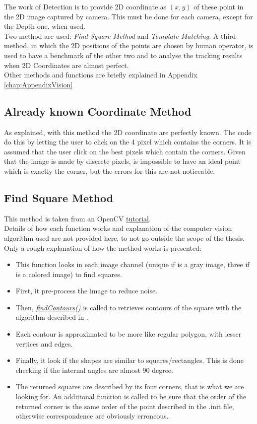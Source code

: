 The work of Detection is to provide 2D coordinate as $(x,y)$ of these point in the 2D image captured by camera. This must be done for each camera, except for the Depth one, when used.\\
Two method are used: \textit{Find Square Method} and \textit{Template Matching}. A third method, in which the 2D positions of the points are chosen by human operator, is used to have a benchmark of the other two and to analyse the tracking results when 2D Coordinates are almost perfect.\\
Other methods and functions are briefly explained in Appendix \ref{chap:AppendixVision} 

\subsection{Already known Coordinate Method}
As explained, with this method the 2D coordinate are perfectly known. The code do this by letting the user to click on the 4 pixel which contains the corners. It is assumed that the user click on the best pixels which contain the corners. Given that the image is made by discrete pixels, is impossible to have an ideal point which is exactly the corner, but the errors for this are not noticeable.\\

\subsection{Find Square Method}
This method is taken from an OpenCV \href{https://docs.opencv.org/3.4/db/d00/samples_2cpp_2squares_8cpp-example.html}{tutorial}.\\
Details of how each function works and explanation of the computer vision algorithm used are not provided here, to not go outside the scope of the thesis. Only a rough explanation of how the method works is presented:
\begin{itemize}
	\item This function looks in each image channel (unique if is a gray image, three if is a colored image) to find squares.
	\item First, it pre-process the image to reduce noise.
	\item Then, \href{https://docs.opencv.org/3.4.6/d3/dc0/group__imgproc__shape.html#ga17ed9f5d79ae97bd4c7cf18403e1689a}{\textit{findContours()}} is called to retrieves contours of the square with the algorithm described in \cite{findcountors}.
	\item Each contour is approximated to be more like regular polygon, with lesser vertices and edges.
	\item Finally, it look if the shapes are similar to squares/rectangles. This is done checking if the internal angles are almost 90 degree.
	\item The returned squares are described by its four corners, that is what we are looking for. An additional function is called to be sure that the order of the returned corner is the same order of the point described in the .init file, otherwise correspondence are obviously erroneous.	
\end{itemize}

